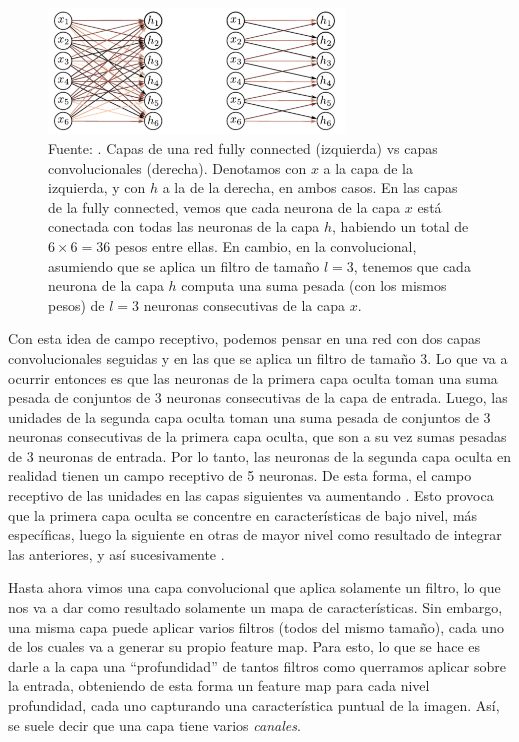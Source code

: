 \documentclass[../../main.tex]{subfiles}
\begin{document}
\begin{figure}
    \centering
    \includegraphics[width=0.7\textwidth]{figs/fully-connected-vs-conv.png}
    \caption{Fuente: \cite{prince2024understanding}. Capas de una red fully connected
    (izquierda) vs capas convolucionales (derecha). Denotamos con \(x\) a la capa de la
    izquierda, y con \(h\) a la de la derecha, en ambos casos. En las capas de la fully
    connected, vemos que cada neurona de la capa \(x\) está conectada con todas las
    neuronas de la capa \(h\), habiendo un total de \(6 \times 6 = 36\) pesos entre ellas.
    En cambio, en la convolucional, asumiendo que se aplica un filtro de tamaño \(l=3\),
    tenemos que cada neurona de la capa \(h\) computa una suma pesada (con los mismos
    pesos) de \(l=3\) neuronas consecutivas de la capa \(x\).}
    \label{fig:fully-connected-vs-conv}
\end{figure}

Con esta idea de campo receptivo, podemos pensar en una red con dos capas convolucionales
seguidas y en las que se aplica un filtro de tamaño 3. Lo que va a ocurrir entonces es que
las neuronas de la primera capa oculta toman una suma pesada de conjuntos de 3 neuronas
consecutivas de la capa de entrada. Luego, las unidades de la segunda capa oculta toman
una suma pesada de conjuntos de 3 neuronas consecutivas de la primera capa oculta, que son
a su vez sumas pesadas de 3 neuronas de entrada. Por lo tanto, las neuronas de la segunda
capa oculta en realidad tienen un campo receptivo de 5 neuronas. De esta forma, el campo
receptivo de las unidades en las capas siguientes va aumentando \cite{prince2024understanding}.
Esto provoca que la primera capa oculta se concentre en características de bajo nivel,
más específicas, luego la siguiente en otras de mayor nivel como resultado de integrar
las anteriores, y así sucesivamente \cite{hands-on-ML-sklearn-tf}.

Hasta ahora vimos una capa convolucional que aplica solamente un filtro, lo que nos va a
dar como resultado solamente un mapa de características. Sin embargo, una misma capa puede
aplicar varios filtros (todos del mismo tamaño), cada uno de los cuales va a generar su
propio feature map. Para esto, lo que se hace es darle a la capa una ``profundidad'' de
tantos filtros como querramos aplicar sobre la entrada, obteniendo de esta forma un feature
map para cada nivel profundidad, cada uno capturando una característica puntual de la imagen.
Así, se suele decir que una capa tiene varios \textit{canales}.
\end{document}
